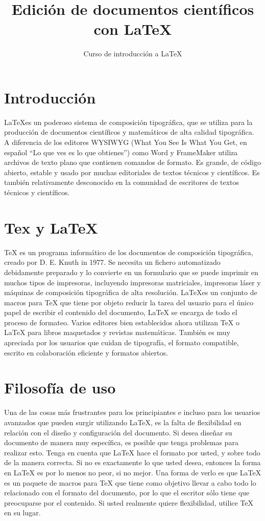 \documentclass[letterpaper,11pt]{article}
\title{Edición de documentos científicos con \LaTeX}
\author{Curso de introducción a LaTeX}
\begin{document}
\maketitle %
\tableofcontents

\section{Introducción}
\label{sec:intro}
\LaTeX es un poderoso sistema de composición tipográfica, que se utiliza
para la producción de documentos científicos y matemáticos
de alta calidad tipográfica. A diferencia de los editores WYSIWYG (What You See Is What You Get, en español ``Lo que ves es lo que obtienes'') como Word y FrameMaker 
utiliza archivos de texto plano que contienen 
comandos de formato. Es grande, de código abierto, estable y usado
por muchas editoriales de textos técnicos y científicos. Es
también relativamente desconocido en la comunidad de escritores de textos técnicos y científicos.

\newpage

\section{Tex y LaTeX}
\label{sec:texvslatex}
TeX es un programa informático de los documentos de composición tipográfica, creado por D. E. Knuth in 1977. Se necesita un fichero automatizado debidamente preparado y lo convierte en un formulario que se puede imprimir en muchos tipos de impresoras, incluyendo impresoras matriciales, impresoras láser y máquinas de composición tipográfica de alta resolución. \LaTeX es un conjunto de macros para TeX que tiene por objeto reducir la tarea del usuario para el único papel de escribir el contenido del documento, LaTeX se encarga de todo el proceso de formateo. Varios editores bien establecidos ahora utilizan TeX o LaTeX para libros maquetados y revistas matemáticas. También es muy apreciada por los usuarios que cuidan de tipografía, el formato compatible, escrito en colaboración eficiente y formatos abiertos. 

\section{Filosofía de uso}
\label{sec:filosofia}
Una de las cosas más frustrantes para los principiantes e incluso para los usuarios avanzados que pueden surgir utilizando \LaTeX, es la falta de flexibilidad en relación con el diseño y configuración del documento. Si desea diseñar su documento de manera muy específica, es posible que tenga problemas para realizar esto. Tenga en cuenta que LaTeX hace el formato por usted, y sobre todo de la manera correcta. Si no es exactamente lo que usted desea, entonces la forma en LaTeX es por lo menos no peor, si no mejor. Una forma de verlo es que LaTeX es un paquete de macros para TeX que tiene como objetivo llevar a cabo todo lo relacionado con el formato del documento, por lo que el escritor sólo tiene que preocuparse por el contenido. Si usted realmente quiere flexibilidad, utilice TeX en su lugar. 
\end{document}
